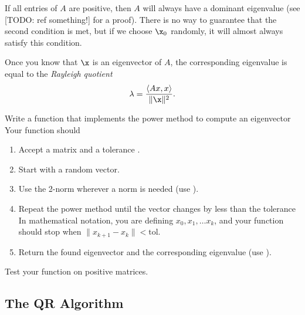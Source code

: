 If all entries of $A$ are positive, then $A$ will always have a dominant eigenvalue (see [TODO: ref something!] for a proof).
There is no way to guarantee that the second condition is met, but if we choose $\x_0$ randomly, it will almost always satisfy this condition.

Once you know that $\x$ is an eigenvector of $A$, the corresponding eigenvalue is equal to the \emph{Rayleigh quotient}
\[
\lambda = \frac{\langle Ax, x \rangle}{\|\x\|^2}.
\]

\begin{problem} %
Write a function that implements the power method to compute an eigenvector
Your function should
\begin{enumerate}
\item Accept a matrix and a tolerance .
\item Start with a random vector.
\item Use the 2-norm wherever a norm is needed (use ).
\item Repeat the power method until the vector changes by less than the tolerance
In mathematical notation, you are defining $x_0, x_1, \ldots x_k$, and your function should stop when $\|x_{k+1}-x_k\| < \text{tol}$.
\item Return the found eigenvector and the corresponding eigenvalue (use ).
\end{enumerate}
Test your function on positive matrices.
\end{problem}

\subsection*{The QR Algorithm} %

